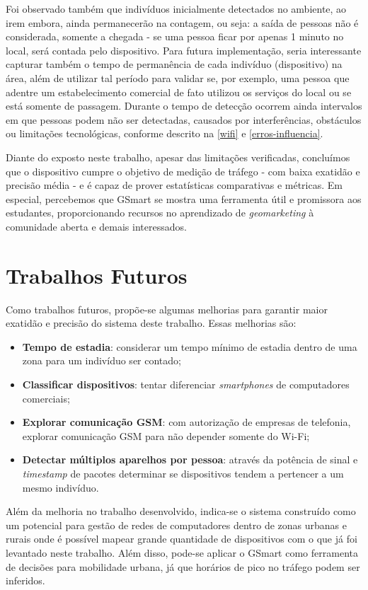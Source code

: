 Foi observado também que indivíduos inicialmente detectados no ambiente, ao irem embora, ainda permanecerão na contagem, ou seja: a saída de pessoas não é considerada, somente a chegada - se uma pessoa ficar por apenas 1 minuto no local, será contada pelo dispositivo. Para futura implementação, seria interessante capturar também o tempo de permanência de cada indivíduo (dispositivo) na área, além de utilizar tal período para validar se, por exemplo, uma pessoa que adentre um estabelecimento comercial de fato utilizou os serviços do local ou se está somente de passagem. Durante o tempo de detecção ocorrem ainda intervalos em que pessoas podem não ser detectadas, causados por interferências, obstáculos ou limitações tecnológicas, conforme descrito na \autoref{wifi} e \autoref{erros-influencia}.

Diante do exposto neste trabalho, apesar das limitações verificadas, concluímos
que o dispositivo cumpre o objetivo de medição de tráfego - com baixa exatidão e precisão média -
e é capaz de prover estatísticas comparativas e métricas. Em especial, percebemos que GSmart se mostra uma
ferramenta útil e promissora aos estudantes, proporcionando recursos no aprendizado de \emph{geomarketing} à comunidade aberta e demais interessados.


\section{Trabalhos Futuros}
Como trabalhos futuros, propõe-se algumas melhorias para garantir maior exatidão e
precisão do sistema deste trabalho. Essas melhorias são:
\begin{itemize}
    \item \textbf{Tempo de estadia}: considerar um tempo mínimo de estadia dentro de uma zona para um indivíduo ser contado;
    \item \textbf{Classificar dispositivos}: tentar diferenciar \emph{smartphones} de computadores comerciais;
    \item \textbf{Explorar comunicação GSM}: com autorização de empresas de telefonia, explorar comunicação GSM para não depender somente do Wi-Fi;
    \item \textbf{Detectar múltiplos aparelhos por pessoa}: através da potência de sinal e \emph{timestamp}
    de pacotes determinar se dispositivos tendem a pertencer a um mesmo indivíduo.
\end{itemize}

Além da melhoria no trabalho desenvolvido, indica-se o sistema construído como um potencial para gestão de redes
de computadores dentro de zonas urbanas e rurais onde é possível mapear grande quantidade de dispositivos com o
que já foi levantado neste trabalho. Além disso, pode-se aplicar o GSmart como ferramenta de decisões para mobilidade urbana, já que horários de pico no tráfego podem ser inferidos.
